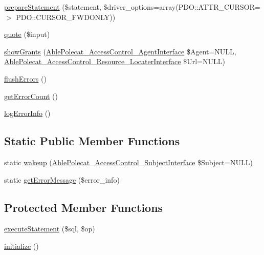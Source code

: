 \begin{DoxyCompactItemize}
\item 
\hyperlink{class_able_polecat___database___pdo_a374c56d08c9fb9b44796f1a55512b974}{prepare\+Statement} (\$statement, \$driver\+\_\+options=array(P\+D\+O\+::\+A\+T\+T\+R\+\_\+\+C\+U\+R\+S\+O\+R=$>$ P\+D\+O\+::\+C\+U\+R\+S\+O\+R\+\_\+\+F\+W\+D\+O\+N\+L\+Y))
\item 
\hyperlink{class_able_polecat___database___pdo_ad6688f4cd3234b8d40f8f92bbcd07e73}{quote} (\$input)
\item 
\hyperlink{class_able_polecat___database___pdo_a045c11c3faab21a4b0011b28d76f621d}{show\+Grants} (\hyperlink{interface_able_polecat___access_control___agent_interface}{Able\+Polecat\+\_\+\+Access\+Control\+\_\+\+Agent\+Interface} \$Agent=N\+U\+L\+L, \hyperlink{interface_able_polecat___access_control___resource___locater_interface}{Able\+Polecat\+\_\+\+Access\+Control\+\_\+\+Resource\+\_\+\+Locater\+Interface} \$Url=N\+U\+L\+L)
\item 
\hyperlink{class_able_polecat___database___pdo_a0178cc2ececccefdc65d2c7d1c8fd518}{flush\+Errors} ()
\item 
\hyperlink{class_able_polecat___database___pdo_a20e663e9d39779d1c343740f36c3137a}{get\+Error\+Count} ()
\item 
\hyperlink{class_able_polecat___database___pdo_a3fdddf6c2c95a4b45cf1a8468f07477d}{log\+Error\+Info} ()
\end{DoxyCompactItemize}
\subsection*{Static Public Member Functions}
\begin{DoxyCompactItemize}
\item 
static \hyperlink{class_able_polecat___database___pdo_a3f2135f6ad45f51d075657f6d20db2cd}{wakeup} (\hyperlink{interface_able_polecat___access_control___subject_interface}{Able\+Polecat\+\_\+\+Access\+Control\+\_\+\+Subject\+Interface} \$Subject=N\+U\+L\+L)
\item 
static \hyperlink{class_able_polecat___database___pdo_a390a90ffac274ffff05475b2702341ed}{get\+Error\+Message} (\$error\+\_\+info)
\end{DoxyCompactItemize}
\subsection*{Protected Member Functions}
\begin{DoxyCompactItemize}
\item 
\hyperlink{class_able_polecat___database___pdo_a1927c7a436d775d3fe5ed7176a500037}{execute\+Statement} (\$sql, \$op)
\item 
\hyperlink{class_able_polecat___database___pdo_a91098fa7d1917ce4833f284bbef12627}{initialize} ()
\end{DoxyCompactItemize}
